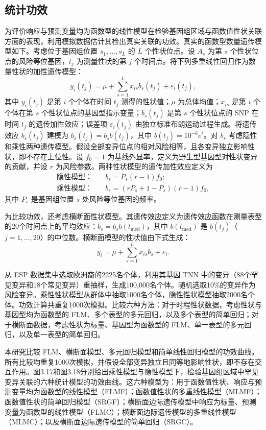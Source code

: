 

\FloatBarrier

\subsection{统计功效}

为评价响应与预测变量均为函数型的线性模型在检验基因组区域与函数值性状关联方面的表现，利用模拟数据估计其检出真实关联的功效。真实的函数型数量遗传模型如下。考虑位于基因组位置 $s_1,\ldots,s_L$ 的 $L$ 个性状位点。设 $A_s$ 为第 $s$ 个性状位点的风险等位基因，$t_j$ 为测量性状的第 $j$ 个时间点。将下列多重线性回归作为数量性状的加性遗传模型：
\[
y_i(t_j)=\mu+\sum_{s=1}^{L}x_{is}b_s(t_j)+\varepsilon_i(t_j),
\]
其中 $y_i(t_j)$ 是第 $i$ 个个体在时间 $t_j$ 测得的性状值；$\mu$ 为总体均值；$x_{is}$ 是第 $i$ 个个体在第 $s$ 个性状位点的基因型指示变量；$b_s(t_j)$ 是第 $s$ 个性状位点的 SNP 在时间 $t_j$ 的遗传加性效应；误差项 $\varepsilon_i(t_j)$ 由独立标准布朗运动过程生成。将遗传效应 $b_s(t_j)$ 建模为 $b_s(t_j)=b_sb(t_j)$，其中 $b(t_j)=10^{-6}e^t$。对 $b_s$ 考虑隐性和乘性两种遗传模型。假设全部变异位点的相对风险相等，且各变异独立影响性状，即不存在上位性。设 $f_0=1$ 为基线外显率，定义为野生型基因型对性状变异的贡献，并设 $r$ 为风险参数。两种性状模型的遗传加性效应定义为
\[
\begin{aligned}
\text{隐性模型：}\quad &b_s=P_s(r-1)f_0;\\
\text{乘性模型：}\quad &b_s=(rP_s+1-P_s)(r-1)f_0,
\end{aligned}
\]
其中 $P_s$ 是基因组位置 $s$ 处风险等位基因的频率。

为比较功效，还考虑横断面性状模型。其遗传效应定义为遗传效应函数在测量表型的20个时间点上的平均效应：$\bar b_s=b_sb(t_{\mathrm{med}})$，其中 $b(t_{\mathrm{med}})$ 是 $b(t_j)$（$j=1,\ldots,20$）的中位数。横断面模型的性状值由下式生成：
\[
y_i=\mu+\sum_{s=1}^{L}x_{is}\bar b_s+\varepsilon_i.
\]

从 ESP 数据集中选取欧洲裔的2225名个体，利用其基因 TNN 中的变异（88个罕见变异和18个常见变异）重抽样，生成100,000名个体。随机选取10\%的变异作为风险变异。乘性性状模型从群体中抽取1000名个体，隐性性状模型抽取2000名个体。功效计算共重复1000次模拟。比较六种方法：对于时程性状数据，考虑性状与基因型均为函数型的 FLM、多个表型的多元回归，以及多个表型的简单回归；对于横断面数据，考虑性状为标量、基因型为函数型的 FLM、单一表型的多元回归，以及单一表型的简单回归。

本研究比较 FLM、横断面模型、多元回归模型和简单线性回归模型的功效曲线。所有比较均重复1000次模拟，并假设全部变异独立且同等地影响性状，即不存在交互作用。图3.17和图3.18分别给出乘性模型与隐性模型下，检验基因组区域中罕见变异关联的六种统计模型的功效曲线。这六种模型为：用于函数值性状、响应与预测变量均为函数型的线性模型（FLMF）；函数值性状的多重线性模型（MLMF）；函数值性状的简单回归模型（SRGF）；横断面边际遗传模型中响应为标量、预测变量为函数型的线性模型（FLMC）；横断面边际遗传模型的多重线性模型（MLMC）；以及横断面边际遗传模型的简单回归（SRGC）。

